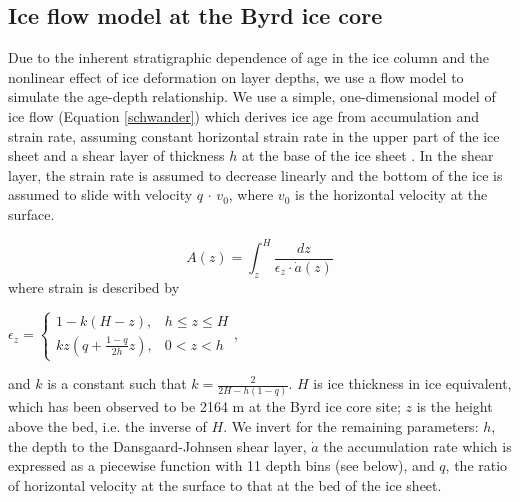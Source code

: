 \subsection{Ice flow model at the Byrd ice core}

Due to the inherent stratigraphic dependence of age in the ice column and the nonlinear effect of ice deformation on layer depths, we use a flow model to simulate the age-depth relationship. We use a simple, one-dimensional model of ice flow (Equation \ref{schwander}) which derives ice age from accumulation and strain rate, assuming constant horizontal strain rate in the upper part of the ice sheet and a shear layer of thickness $h$ at the base of the ice sheet \citep{schwander2001}. In the shear layer, the strain rate is assumed to decrease linearly and the bottom of the ice is assumed to slide with velocity $q$ $\cdot$ $v_0$, where $v_0$ is the horizontal velocity at the surface.

\begin{equation}\label{schwander}
A(z) = \int_{z}^{H} \frac{dz}{\epsilon_z \cdot \dot{a}(z)}
\end{equation}
where strain is described by
\begin{center}
$    \epsilon_z=
    \begin{cases}
                 1-k(H-z), & h \leq z \leq H \\
                  kz(q+\frac{1-q}{2h}z), & 0 < z < h
    \end{cases}, 
$

\end{center}
and $k$ is a constant such that $k = \frac{2}{2H - h(1-q)}$. $H$ is ice thickness in ice equivalent, which has been observed to be 2164 m at the Byrd ice core site; $z$ is the height above the bed, i.e. the inverse of $H$. We invert for the remaining parameters: $h$, the depth to the Dansgaard-Johnsen shear layer, $\dot{a}$ the accumulation rate which is expressed as a piecewise function with 11 depth bins (see below), and $q$, the ratio of horizontal velocity at the surface to that at the bed of the ice sheet.

